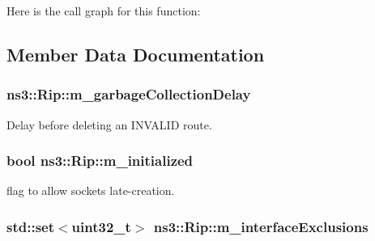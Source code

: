 Here is the call graph for this function\+:




\subsection{Member Data Documentation}
\subsubsection[{\texorpdfstring{m\+\_\+garbage\+Collection\+Delay}{m_garbageCollectionDelay}}]{ ns3\+::\+Rip\+::m\+\_\+garbage\+Collection\+Delay\hspace{0.3cm}{\ttfamily [private]}}\hypertarget{classns3_1_1Rip_ad317e92ae9d78b20642be47df4e8d866}{}\label{classns3_1_1Rip_ad317e92ae9d78b20642be47df4e8d866}


Delay before deleting an I\+N\+V\+A\+L\+ID route. 

\subsubsection[{\texorpdfstring{m\+\_\+initialized}{m_initialized}}]{\setlength{\rightskip}{0pt plus 5cm}bool ns3\+::\+Rip\+::m\+\_\+initialized\hspace{0.3cm}{\ttfamily [private]}}\hypertarget{classns3_1_1Rip_adb494e48f6b5e4e42bf47a8ad3a25485}{}\label{classns3_1_1Rip_adb494e48f6b5e4e42bf47a8ad3a25485}


flag to allow socket\textquotesingle{}s late-\/creation. 

\subsubsection[{\texorpdfstring{m\+\_\+interface\+Exclusions}{m_interfaceExclusions}}]{\setlength{\rightskip}{0pt plus 5cm}std\+::set$<$uint32\+\_\+t$>$ ns3\+::\+Rip\+::m\+\_\+interface\+Exclusions\hspace{0.3cm}{\ttfamily [private]}}\hypertarget{classns3_1_1Rip_a30e2c00645f24a3b29be981f5d592773}{}\label{classns3_1_1Rip_a30e2c00645f24a3b29be981f5d592773}



